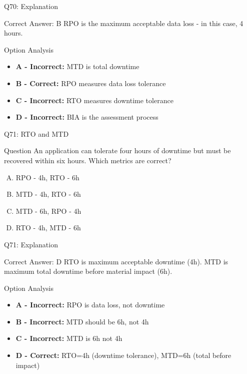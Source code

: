 \documentclass{beamer}
\begin{document}
	\begin{frame}{Q70: Explanation}
		\begin{block}{Correct Answer: B}
			RPO is the maximum acceptable data loss - in this case, 4 hours.
		\end{block}
		\begin{block}{Option Analysis}
			\begin{itemize}
				\item \textbf{A - Incorrect:} MTD is total downtime
				\item \textbf{B - Correct:} RPO measures data loss tolerance
				\item \textbf{C - Incorrect:} RTO measures downtime tolerance
				\item \textbf{D - Incorrect:} BIA is the assessment process
			\end{itemize}
		\end{block}
	\end{frame}
	
	\begin{frame}{Q71: RTO and MTD}
		\begin{block}{Question}
			An application can tolerate four hours of downtime but must be recovered within six hours. Which metrics are correct?
		\end{block}
		\begin{enumerate}[(A)]
			\item RPO - 4h, RTO - 6h
			\item MTD - 4h, RTO - 6h
			\item MTD - 6h, RPO - 4h
			\item RTO - 4h, MTD - 6h
		\end{enumerate}
	\end{frame}
	
	\begin{frame}{Q71: Explanation}
		\begin{block}{Correct Answer: D}
			RTO is maximum acceptable downtime (4h). MTD is maximum total downtime before material impact (6h).
		\end{block}
		\begin{block}{Option Analysis}
			\begin{itemize}
				\item \textbf{A - Incorrect:} RPO is data loss, not downtime
				\item \textbf{B - Incorrect:} MTD should be 6h, not 4h
				\item \textbf{C - Incorrect:} MTD is 6h not 4h
				\item \textbf{D - Correct:} RTO=4h (downtime tolerance), MTD=6h (total before impact)
			\end{itemize}
		\end{block}
	\end{frame}
	
\end{document}
